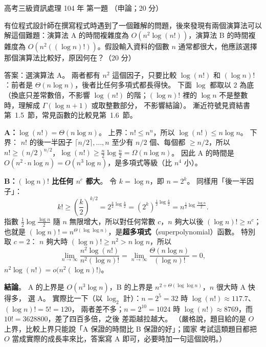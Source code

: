 \begin{pastexam}[label={px:gk3-104-ds-01}]{高考三級資訊處理 104 年 第一題}
（申論；20 分）

有位程式設計師在撰寫程式時遇到了一個難解的問題，後來發現有兩個演算法可以解這個難題：演算法 A 的時間複雜度為 $O(n^2\log(n!))$，演算法 B 的時間複雜度為 $O(n^2((\log n)!))$。假設輸入資料的個數 $n$ 通常都很大，他應該選擇那個演算法比較好，原因何在？（20 分）
\end{pastexam}

\begin{pastsoln}
答案：選演算法 A。 兩者都有 $n^2$ 這個因子，只要比較 $\log(n!)$ 和 $(\log n)!$：前者是
$\Theta(n \log n)$，後者比任何多項式都長得快。 下面 $\log$ 都取以 $2$ 為底（換底只差常數倍，不影響
$\log(n!)$ 的階；$(\log n)!$ 裡的 $\log n$ 不是整數時，理解成 $\Gamma(\log n + 1)$ 或取整數部分，
不影響結論）。 漸近符號見資結書第~1.5~節，常見函數的比較見第~1.6~節。

\textbf{A：$\log(n!) = \Theta(n \log n)$}。 上界：$n! \le n^n$，所以 $\log(n!) \le n \log n$。 下界：
$n!$ 的後一半因子 $\lceil n/2 \rceil, \ldots, n$ 至少有 $n/2$ 個、每個都 $\ge n/2$，所以
$n! \ge (n/2)^{n/2}$，$\log(n!) \ge \frac{n}{2}\log\frac{n}{2} = \Omega(n \log n)$。 因此 A 的時間是
$O(n^2 \cdot n \log n) = O(n^3 \log n)$，是多項式等級（比 $n^4$ 小）。

\textbf{B：$(\log n)!$ 比任何 $n^c$ 都大}。 令 $k = \log n$，即 $n = 2^k$。 同樣用「後一半因子」：
\[
k! \ge \left(\frac{k}{2}\right)^{k/2} = 2^{\frac{k}{2}\log\frac{k}{2}} = \left(2^{k}\right)^{\frac12\log\frac{k}{2}} = n^{\frac12 \log\frac{\log n}{2}}.
\]
指數 $\frac12 \log\frac{\log n}{2}$ 隨 $n$ 無限增大，所以對任何常數 $c$，$n$ 夠大以後 $(\log n)! \ge n^{c}$；
也就是 $(\log n)! = n^{\Theta(\log\log n)}$，是\textbf{超多項式}（superpolynomial）函數。 特別取 $c = 2$：
$n$ 夠大時 $(\log n)! \ge n^2 > n \log n$，所以
\[
\lim_{n \to \infty} \frac{n^2 \log(n!)}{n^2 (\log n)!} = \lim_{n \to \infty} \frac{\Theta(n \log n)}{(\log n)!} = 0,
\]
$n^2 \log(n!) = o\bigl(n^2 (\log n)!\bigr)$。

\textbf{結論}。 A 的上界是 $O(n^3 \log n)$，B 的上界是 $n^{2 + \Theta(\log \log n)}$，$n$ 很大時 A 快得多，
選 A。 實際比一下（以 $\log_2$ 計）：$n = 2^5 = 32$ 時 $\log(n!) \approx 117.7$、$(\log n)! = 5! = 120$，
兩者差不多；$n = 2^{10} = 1024$ 時 $\log(n!) \approx 8769$，而 $10! = 3628800$，差了四百多倍，之後
差距越拉越大。 （嚴格說，題目給的是 $O$ 上界，比較上界只能說「A 保證的時間比 B 保證的好」；國家
考試這類題目都把 $O$ 當成實際的成長率來比，答案寫 A 即可，必要時加一句這個說明。）
\end{pastsoln}
